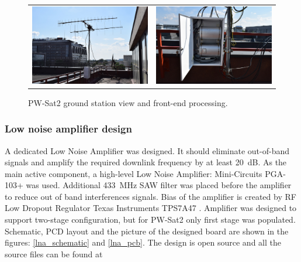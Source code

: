 \begin{figure}
   \centering
\begin{tabular}{cc}
        \includegraphics[width=0.3\paperwidth]{img/3/elka_view.jpg}
    & 
        \includegraphics[width=0.3\paperwidth]{img/3/elka_skrzynka.jpg}
\end{tabular}
\label{elka_skrzynka}
\caption{PW-Sat2 ground station view and front-end processing.}
\end{figure}


\subsubsection{Low noise amplifier design}
A dedicated Low Noise Amplifier was designed. It should eliminate out-of-band signals and amplify the required downlink frequency by at least \SI{20}{\dB}. As the main active component, a high-level Low Noise Amplifier: Mini-Circuits PGA-103+ \cite{lna_pga_datasheet} was used. Additional \SI{433}{\MHz} SAW filter was placed before the amplifier to reduce out of band interferences signals. Bias of the amplifier is created by RF Low Dropout Regulator Texas Instruments TPS7A47 \cite{lna_ldo_datasheet}. Amplifier was designed to support two-stage configuration, but for PW-Sat2 only first stage was populated. Schematic, PCD layout and the picture of the designed board are shown in the figures: \ref{lna_schematic} and \ref{lna_pcb}. The design is open source and all the source files can be found at \cite{lna_github}

